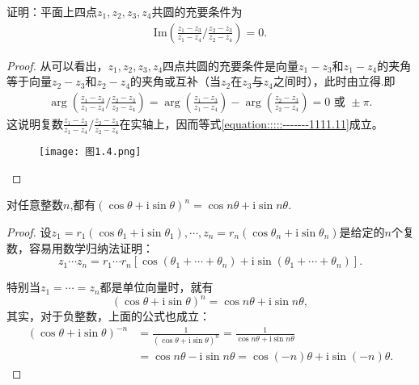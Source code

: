 \documentclass[../../main.tex]{subfiles}
\begin{document}
\begin{example}
证明：平面上四点\(z_1, z_2, z_3, z_4\)共圆的充要条件为
\begin{align}\label{equation:::::-------1111.11}
\mathrm{Im}\left( \frac{z_1 - z_3}{z_1 - z_4} \bigg/ \frac{z_2 - z_3}{z_2 - z_4} \right) = 0.
\end{align}
\end{example}
\begin{proof}
从可以看出，\(z_1, z_2, z_3, z_4\)四点共圆的充要条件是向量\(z_1 - z_3\)和\(z_1 - z_4\)的夹角等于向量\(z_2 - z_3\)和\(z_2 - z_4\)的夹角或互补（当\(z_2\)在\(z_3\)与\(z_4\)之间时），此时由立得.即
\[
\begin{split}
\arg\left( \frac{z_1 - z_3}{z_1 - z_4} \bigg/ \frac{z_2 - z_3}{z_2 - z_4} \right) = \arg\left( \frac{z_1 - z_3}{z_1 - z_4} \right) - \arg\left( \frac{z_2 - z_3}{z_2 - z_4} \right) 
= 0 \text{ 或 } \pm \pi.
\end{split}
\]
这说明复数\(\frac{z_1 - z_3}{z_1 - z_4} \bigg/ \frac{z_2 - z_3}{z_2 - z_4}\)在实轴上，因而等式\eqref{equation:::::-------1111.11}成立。
\begin{figure}[H]
\centering
\texttt{[image: 图1.4.png]}
\caption{}
\label{figure:图1.4}
\end{figure} 
\end{proof}

\begin{theorem}[De Moivre公式]\label{theorem:De Moivre公式}
对任意整数$n$,都有$(\cos\theta + \mathrm{i}\sin\theta)^n = \cos n\theta + \mathrm{i}\sin n\theta.$
\end{theorem}
\begin{proof}
设\(z_1 = r_1(\cos\theta_1 + \mathrm{i}\sin\theta_1), \cdots, z_n = r_n(\cos\theta_n + \mathrm{i}\sin\theta_n)\)是给定的\(n\)个复数，容易用数学归纳法证明：
\[
z_1 \cdots z_n = r_1 \cdots r_n[\cos(\theta_1 + \cdots + \theta_n) + \mathrm{i}\sin(\theta_1 + \cdots + \theta_n)].
\]

特别当\(z_1 = \cdots = z_n\)都是单位向量时，就有
\[
(\cos\theta + \mathrm{i}\sin\theta)^n = \cos n\theta + \mathrm{i}\sin n\theta,
\]
其实，对于负整数，上面的公式也成立：
\[
\begin{split}
(\cos\theta + \mathrm{i}\sin\theta)^{-n} &= \frac{1}{(\cos\theta + \mathrm{i}\sin\theta)^n} = \frac{1}{\cos n\theta + \mathrm{i}\sin n\theta} \\
&= \cos n\theta - \mathrm{i}\sin n\theta = \cos(-n)\theta + \mathrm{i}\sin(-n)\theta.
\end{split}
\]
\end{proof}
\end{document}
